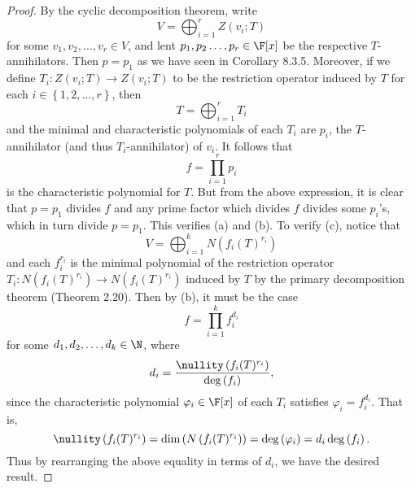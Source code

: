 \documentclass[linearalgebra]{subfiles}
\begin{document}
    \begin{proof}
        By the cyclic decomposition theorem, write
        \begin{equation*}
            V = \bigoplus^{r}_{i=1} Z(v_i;T)
        \end{equation*}
        for some $v_1,v_2,\ldots,v_r\in V$, and lent $p_1,p_2\ldots,p_r\in\F[x]$ be the respective $T$-annihilators. Then $p=p_1$ as we have seen in Corollary 8.3.5. Moreover, if we define $T_i:Z\left( v_i;T \right) \to Z\left( v_i;T \right)$ to be the restriction operator induced by $T$ for each $i\in \left\lbrace 1,2,\ldots,r \right\rbrace $, then
        \begin{equation*}
            T = \bigoplus^{r}_{i=1} T_i
        \end{equation*}
        and the minimal and characteristic polynomials of each $T_i$ are $p_i$, the $T$-annihilator (and thus $T_i$-annihilator) of $v_i$. It follows that
        \begin{equation*}
            f = \prod^{r}_{i=1} p_i
        \end{equation*}
        is the characteristic polynomial for $T$. But from the above expression, it is clear that $p=p_1$ divides $f$ and any prime factor which divides $f$ divides some $p_i$'s, which in turn divide $p=p_1$. This verifies (a) and (b). To verify (c), notice that
        \begin{equation*}
            V = \bigoplus^{k}_{i=1} N\left( f_i(T)^{r_i} \right) 
        \end{equation*}
        and each $f_i^{r_i}$ is the minimal polynomial of the restriction operator $T_i:N\left( f_i(T)^{r_i} \right) \to N\left( f_i(T)^{r_i} \right)$ induced by $T$ by the primary decomposition theorem (Theorem 2.20). Then by (b), it must be the case
        \begin{equation*}
            f = \prod^{k}_{i=1} f_i^{d_i}
        \end{equation*}
        for some $d_1,d_2,\ldots,d_k\in\N$, where
        \begin{equation*}
            d_i = \frac{\nullity\left( f_i(T)^{r_i} \right) }{\deg\left( f_i \right) },
        \end{equation*}
        since the characteristic polynomial $\varphi_i\in\F[x]$ of each $T_i$ satisfies $\varphi_i=f_i^{d_i}$. That is,
        \begin{equation*}
            \nullity\left( f_i(T)^{r_i} \right) = \dim\left( N\left( f_i(T)^{r_i} \right)  \right) = \deg\left( \varphi_i \right) = d_i\deg\left( f_i \right) .
        \end{equation*}
        Thus by rearranging the above equality in terms of $d_i$, we have the desired result.
    \end{proof}
\end{document}
